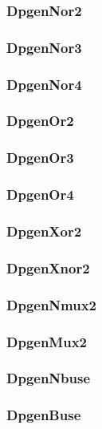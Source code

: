 \documentclass[12pt]{article}
\begin{document}
        \subsubsection{DpgenNor2} 
        
        \subsubsection{DpgenNor3} 
        
        \subsubsection{DpgenNor4} 
        
        \subsubsection{DpgenOr2} 
        
        \subsubsection{DpgenOr3} 
        
        \subsubsection{DpgenOr4} 
        
        \subsubsection{DpgenXor2} 
        
        \subsubsection{DpgenXnor2} 
        
        \subsubsection{DpgenNmux2}
        
        \subsubsection{DpgenMux2}
        
        \subsubsection{DpgenNbuse} 
        
        \subsubsection{DpgenBuse}
        
\end{document}
